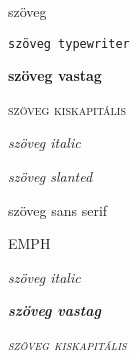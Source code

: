 \documentclass{article}
\begin{document}
\rmfamily
szöveg

\texttt{szöveg typewriter}

\textbf{szöveg vastag}

\textsc{szöveg kiskapitális}

\textit{szöveg italic}

\textsl{szöveg slanted}

\textsf{szöveg sans serif}

EMPH

\textit{szöveg \emph{italic}}

\textbf\emph{szöveg vastag}

\textsc\emph{szöveg kiskapitális}
\end{document}
